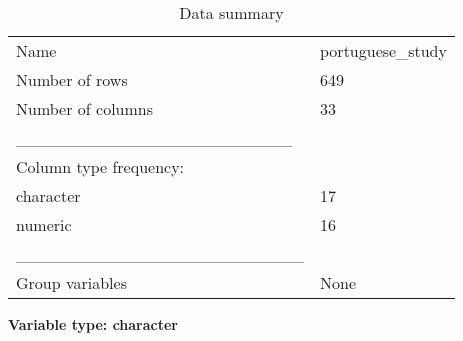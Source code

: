 \documentclass[
]{article}
\begin{document}
\begin{longtable}[]{@{}ll@{}}
\caption{Data summary}\tabularnewline
\toprule()
\endhead
Name & portuguese\_study \\
Number of rows & 649 \\
Number of columns & 33 \\
\_\_\_\_\_\_\_\_\_\_\_\_\_\_\_\_\_\_\_\_\_\_\_ & \\
Column type frequency: & \\
character & 17 \\
numeric & 16 \\
\_\_\_\_\_\_\_\_\_\_\_\_\_\_\_\_\_\_\_\_\_\_\_\_ & \\
Group variables & None \\
\bottomrule()
\end{longtable}

\textbf{Variable type: character}
\end{document}
